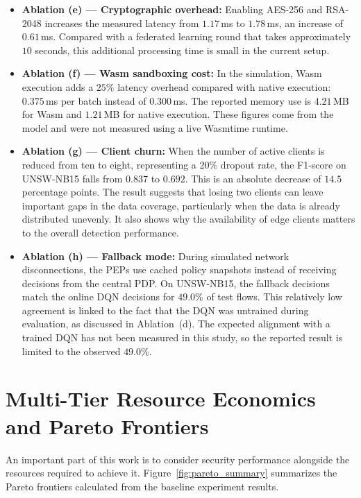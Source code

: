\documentclass[11pt,a4paper]{article}
\newcommand{\bigsection}[1]{\FloatBarrier\Needspace*{0.22\textheight}\section{#1}}
\begin{document}
\begin{itemize}[leftmargin=1.6em,itemsep=2pt]
    \item \textbf{Ablation (e) --- Cryptographic overhead:} Enabling AES-256 and RSA-2048 increases the measured latency from $1.17$\,ms to $1.78$\,ms, an increase of $0.61$\,ms. Compared with a federated learning round that takes approximately $10$ seconds, this additional processing time is small in the current setup.

    \item \textbf{Ablation (f) --- Wasm sandboxing cost:} In the simulation, Wasm execution adds a $25\%$ latency overhead compared with native execution: $0.375$\,ms per batch instead of $0.300$\,ms. The reported memory use is $4.21$\,MB for Wasm and $1.21$\,MB for native execution. These figures come from the model and were not measured using a live Wasmtime runtime.

    \item \textbf{Ablation (g) --- Client churn:} When the number of active clients is reduced from ten to eight, representing a $20\%$ dropout rate, the F1-score on UNSW-NB15 falls from $0.837$ to $0.692$. This is an absolute decrease of $14.5$ percentage points. The result suggests that losing two clients can leave important gaps in the data coverage, particularly when the data is already distributed unevenly. It also shows why the availability of edge clients matters to the overall detection performance.

    \item \textbf{Ablation (h) --- Fallback mode:} During simulated network disconnections, the PEPs use cached policy snapshots instead of receiving decisions from the central PDP. On UNSW-NB15, the fallback decisions match the online DQN decisions for $49.0\%$ of test flows. This relatively low agreement is linked to the fact that the DQN was untrained during evaluation, as discussed in Ablation~(d). The expected alignment with a trained DQN has not been measured in this study, so the reported result is limited to the observed $49.0\%$.
\end{itemize}

\bigsection{Multi-Tier Resource Economics and Pareto Frontiers}\label{sec:pareto}

An important part of this work is to consider security performance alongside the resources required to achieve it. Figure~\ref{fig:pareto_summary} summarizes the Pareto frontiers calculated from the baseline experiment results.
\end{document}
